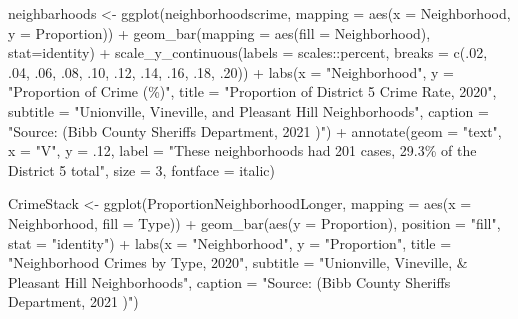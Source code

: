 \documentclass[
]{article}
\newenvironment{Shaded}{\begin{snugshade}}{\end{snugshade}}
\newcommand{\AttributeTok}[1]{\textcolor[rgb]{0.77,0.63,0.00}{#1}}
\newcommand{\DecValTok}[1]{\textcolor[rgb]{0.00,0.00,0.81}{#1}}
\newcommand{\FunctionTok}[1]{\textcolor[rgb]{0.00,0.00,0.00}{#1}}
\newcommand{\NormalTok}[1]{#1}
\newcommand{\OtherTok}[1]{\textcolor[rgb]{0.56,0.35,0.01}{#1}}
\newcommand{\SpecialCharTok}[1]{\textcolor[rgb]{0.00,0.00,0.00}{#1}}
\newcommand{\StringTok}[1]{\textcolor[rgb]{0.31,0.60,0.02}{#1}}
\begin{document}
\begin{Shaded}
\begin{Highlighting}[]
\NormalTok{neighbarhoods }\OtherTok{\textless{}{-}} \FunctionTok{ggplot}\NormalTok{(neighborhoodscrime, }\AttributeTok{mapping =} \FunctionTok{aes}\NormalTok{(}\AttributeTok{x =}\NormalTok{ Neighborhood, }\AttributeTok{y =}\NormalTok{ Proportion)) }\SpecialCharTok{+} \FunctionTok{geom\_bar}\NormalTok{(}\AttributeTok{mapping =} \FunctionTok{aes}\NormalTok{(}\AttributeTok{fill =}\NormalTok{ Neighborhood), }\AttributeTok{stat=}\StringTok{\textquotesingle{}identity\textquotesingle{}}\NormalTok{)  }\SpecialCharTok{+}
\FunctionTok{scale\_y\_continuous}\NormalTok{(}\AttributeTok{labels =}\NormalTok{ scales}\SpecialCharTok{::}\NormalTok{percent, }\AttributeTok{breaks =} \FunctionTok{c}\NormalTok{(.}\DecValTok{02}\NormalTok{, .}\DecValTok{04}\NormalTok{, .}\DecValTok{06}\NormalTok{, .}\DecValTok{08}\NormalTok{, .}\DecValTok{10}\NormalTok{, .}\DecValTok{12}\NormalTok{, .}\DecValTok{14}\NormalTok{, .}\DecValTok{16}\NormalTok{, .}\DecValTok{18}\NormalTok{, .}\DecValTok{20}\NormalTok{)) }\SpecialCharTok{+}
  \FunctionTok{labs}\NormalTok{(}\AttributeTok{x =} \StringTok{"Neighborhood"}\NormalTok{, }\AttributeTok{y =} \StringTok{"Proportion of Crime (\%)"}\NormalTok{,}
     \AttributeTok{title =} \StringTok{"Proportion of District 5 Crime Rate, 2020"}\NormalTok{,}
     \AttributeTok{subtitle =} \StringTok{"Unionville, Vineville, and Pleasant Hill Neighborhoods"}\NormalTok{,}
     \AttributeTok{caption =} \StringTok{"Source: (Bibb County Sheriff\textquotesingle{}s Department, 2021 )"}\NormalTok{) }\SpecialCharTok{+}
  \FunctionTok{annotate}\NormalTok{(}\AttributeTok{geom =} \StringTok{"text"}\NormalTok{, }\AttributeTok{x =} \StringTok{"V"}\NormalTok{, }\AttributeTok{y =}\NormalTok{ .}\DecValTok{12}\NormalTok{,}
           \AttributeTok{label =}       
           \StringTok{"These neighborhoods had }
\StringTok{           201 cases, 29.3\% of }
\StringTok{           the District 5 total"}\NormalTok{, }
           \AttributeTok{size =} \DecValTok{3}\NormalTok{,}
           \AttributeTok{fontface =} \StringTok{\textquotesingle{}italic\textquotesingle{}}\NormalTok{)}

\NormalTok{CrimeStack }\OtherTok{\textless{}{-}} \FunctionTok{ggplot}\NormalTok{(ProportionNeighborhoodLonger,  }\AttributeTok{mapping =} \FunctionTok{aes}\NormalTok{(}\AttributeTok{x =}\NormalTok{ Neighborhood, }\AttributeTok{fill =}\NormalTok{ Type)) }\SpecialCharTok{+} 
  \FunctionTok{geom\_bar}\NormalTok{(}\FunctionTok{aes}\NormalTok{(}\AttributeTok{y =}\NormalTok{ Proportion), }\AttributeTok{position =} \StringTok{"fill"}\NormalTok{, }\AttributeTok{stat =} \StringTok{"identity"}\NormalTok{) }\SpecialCharTok{+}
  \FunctionTok{labs}\NormalTok{(}\AttributeTok{x =} \StringTok{"Neighborhood"}\NormalTok{, }\AttributeTok{y =} \StringTok{"Proportion"}\NormalTok{,}
     \AttributeTok{title =} \StringTok{"Neighborhood Crimes by Type, 2020"}\NormalTok{,}
     \AttributeTok{subtitle =} \StringTok{"Unionville, Vineville, \& Pleasant Hill Neighborhoods"}\NormalTok{,}
     \AttributeTok{caption =} \StringTok{"Source: (Bibb County Sheriff\textquotesingle{}s Department, 2021 )"}\NormalTok{) }


\end{Highlighting}
\end{Shaded}
\end{document}
